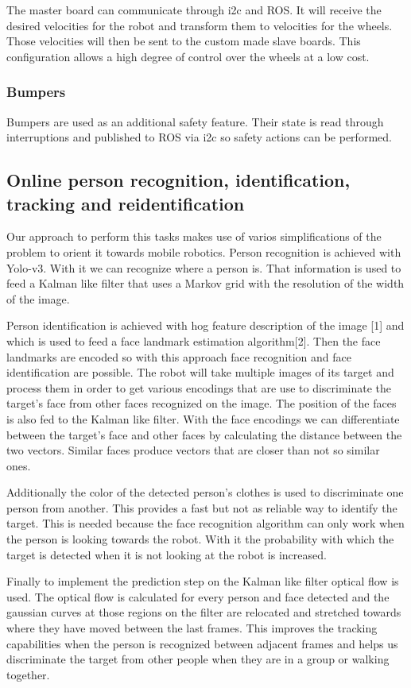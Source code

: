 The master board can communicate through i2c and ROS.
It will receive the desired velocities for the robot and transform them to velocities for the wheels.
Those velocities will then be sent to the custom made slave boards.
This configuration allows a high degree of control over the wheels at a low cost.

\subsubsection{Bumpers}
Bumpers are used as an additional safety feature.
Their state is read through interruptions and published to ROS via i2c so safety actions can be performed.

\subsection{Online person recognition, identification, tracking and reidentification}
Our approach to perform this tasks makes use of varios simplifications of the problem to orient it towards mobile robotics.
Person recognition is achieved with Yolo-v3.
With it we can recognize where a person is.
That information is used to feed a Kalman like filter that uses a Markov grid with the resolution of the width of the image.

Person identification is achieved with hog feature description of the image [1] and which is used to feed a face landmark estimation algorithm[2].
Then the face landmarks are encoded so with this approach face recognition and face identification are possible.
The robot will take multiple images of its target and process them in order to get various encodings that are use to discriminate the target's face from other faces recognized on the image.
The position of the faces is also fed to the Kalman like filter.
With the face encodings we can differentiate between the target's face and other faces by calculating the distance between the two vectors.
Similar faces produce vectors that are closer than not so similar ones.

Additionally the color of the detected person's clothes is used to discriminate one person from another.
This provides a fast but not as reliable way to identify the target.
This is needed because the face recognition algorithm can only work when the person is looking towards the robot.
With it the probability with which the target is detected when it is not looking at the robot is increased.

Finally to implement the prediction step on the Kalman like filter optical flow is used.
The optical flow is calculated for every person and face detected and the gaussian curves at those regions on the filter are relocated and stretched towards where they have moved between the last frames.
This improves the tracking capabilities when the person is recognized between adjacent frames and helps us discriminate the target from other people when they are in a group or walking together.

